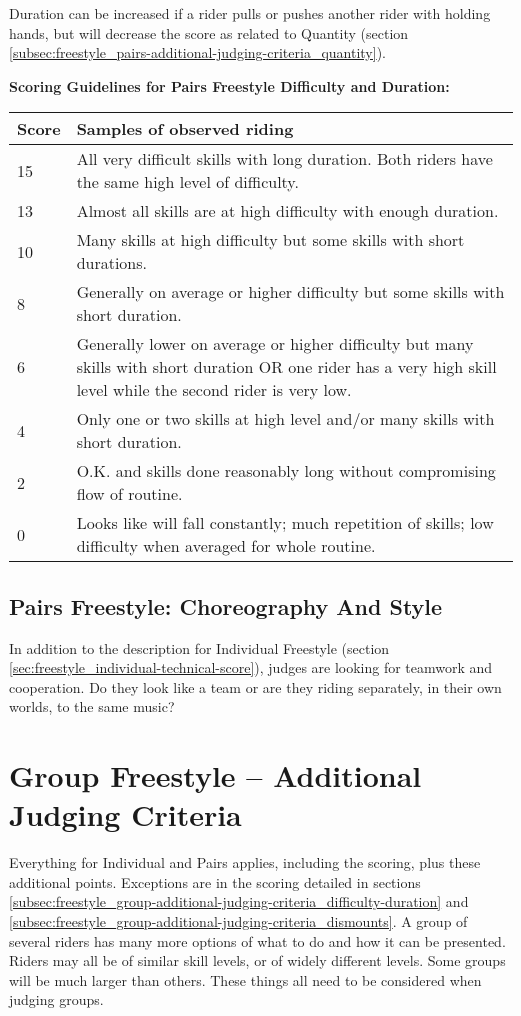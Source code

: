 Duration can be increased if a rider pulls or pushes another rider with holding hands, but will decrease the score as related to Quantity (section \ref{subsec:freestyle_pairs-additional-judging-criteria_quantity}).

\begin{minipage}{\textwidth}
\textbf{Scoring Guidelines for Pairs Freestyle Difficulty and Duration:} \\

\begin{tabular}{|l|p{12.5cm}|}
\hline
\textbf{Score} & \textbf{Samples of observed riding} \\
\hline 
15 & All very difficult skills with long duration. Both riders have the same high level of difficulty. \\
\hline
13 & Almost all skills are at high difficulty with enough duration. \\
\hline
10 & Many skills at high difficulty but some skills with short durations. \\
\hline
8 & Generally on average or higher difficulty but some skills with short duration. \\
\hline
6 & Generally lower on average or higher difficulty but many skills with short duration OR one rider has a very high skill level while the second rider is very low. \\
\hline
4 & Only one or two skills at high level and/or many skills with short duration. \\
\hline
2 & O.K. and skills done reasonably long without compromising flow of routine. \\
\hline
0 & Looks like will fall constantly; much repetition of skills; low difficulty when averaged for whole routine. \\
\hline
\end{tabular}
\end{minipage}

\subsection{Pairs Freestyle: Choreography And Style}
In addition to the description for Individual Freestyle (section \ref{sec:freestyle_individual-technical-score}), judges are looking for teamwork and cooperation.
Do they look like a team or are they riding separately, in their own worlds, to the same music?

\section{Group Freestyle -- Additional Judging Criteria}
Everything for Individual and Pairs applies, including the scoring, plus these additional points.
Exceptions are in the scoring detailed in sections \ref{subsec:freestyle_group-additional-judging-criteria_difficulty-duration} and \ref{subsec:freestyle_group-additional-judging-criteria_dismounts}.
A group of several riders has many more options of what to do and how it can be presented.
Riders may all be of similar skill levels, or of widely different levels.
Some groups will be much larger than others.
These things all need to be considered when judging groups.

